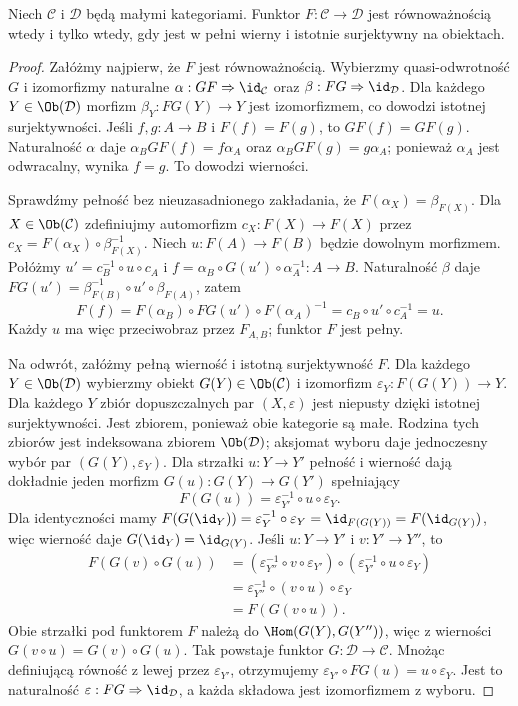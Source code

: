 \begin{twierdzenie}\label{tw:equivalence}
Niech $\mathcal C$ i $\mathcal D$ będą małymi kategoriami. Funktor $F:\mathcal C\to\mathcal D$ jest równoważnością wtedy i tylko wtedy, gdy jest w pełni wierny i istotnie surjektywny na obiektach.
\end{twierdzenie}
\begin{proof}
Załóżmy najpierw, że $F$ jest równoważnością. Wybierzmy quasi-odwrotność $G$ i izomorfizmy naturalne $\alpha:GF\Rightarrow\id_{\mathcal C}$ oraz $\beta:FG\Rightarrow\id_{\mathcal D}$. Dla każdego $Y\in\Ob(\mathcal D)$ morfizm $\beta_Y:FG(Y)\to Y$ jest izomorfizmem, co dowodzi istotnej surjektywności. Jeśli $f,g:A\to B$ i $F(f)=F(g)$, to $GF(f)=GF(g)$. Naturalność $\alpha$ daje $\alpha_BGF(f)=f\alpha_A$ oraz $\alpha_BGF(g)=g\alpha_A$; ponieważ $\alpha_A$ jest odwracalny, wynika $f=g$. To dowodzi wierności.

Sprawdźmy pełność bez nieuzasadnionego zakładania, że $F(\alpha_X)=\beta_{F(X)}$. Dla $X\in\Ob(\mathcal C)$ zdefiniujmy automorfizm $c_X:F(X)\to F(X)$ przez $c_X=F(\alpha_X)\circ\beta_{F(X)}^{-1}$. Niech $u:F(A)\to F(B)$ będzie dowolnym morfizmem. Połóżmy $u'=c_B^{-1}\circ u\circ c_A$ i $f=\alpha_B\circ G(u')\circ\alpha_A^{-1}:A\to B$. Naturalność $\beta$ daje
$FG(u')=\beta_{F(B)}^{-1}\circ u'\circ\beta_{F(A)}$, zatem
\[
F(f)=F(\alpha_B)\circ FG(u')\circ F(\alpha_A)^{-1}
=c_B\circ u'\circ c_A^{-1}=u.
\]
Każdy $u$ ma więc przeciwobraz przez $F_{A,B}$; funktor $F$ jest pełny.

Na odwrót, załóżmy pełną wierność i istotną surjektywność $F$. Dla każdego $Y\in\Ob(\mathcal D)$ wybierzmy obiekt $G(Y)\in\Ob(\mathcal C)$ i izomorfizm $\varepsilon_Y:F(G(Y))\to Y$. Dla każdego $Y$ zbiór dopuszczalnych par $(X,\varepsilon)$ jest niepusty dzięki istotnej surjektywności. Jest zbiorem, ponieważ obie kategorie są małe. Rodzina tych zbiorów jest indeksowana zbiorem $\Ob(\mathcal D)$; aksjomat wyboru daje jednoczesny wybór par $(G(Y),\varepsilon_Y)$. Dla strzałki $u:Y\to Y'$ pełność i wierność dają dokładnie jeden morfizm $G(u):G(Y)\to G(Y')$ spełniający
\[
F(G(u))=\varepsilon_{Y'}^{-1}\circ u\circ\varepsilon_Y.
\]
Dla identyczności mamy $F(G(\id_Y))=\varepsilon_Y^{-1}\circ\varepsilon_Y=\id_{F(G(Y))}=F(\id_{G(Y)})$, więc wierność daje $G(\id_Y)=\id_{G(Y)}$. Jeśli $u:Y\to Y'$ i $v:Y'\to Y''$, to
\[
\begin{aligned}
F(G(v)\circ G(u))
&=(\varepsilon_{Y''}^{-1}\circ v\circ\varepsilon_{Y'})
  \circ(\varepsilon_{Y'}^{-1}\circ u\circ\varepsilon_Y)\\
&=\varepsilon_{Y''}^{-1}\circ(v\circ u)\circ\varepsilon_Y\\
&=F(G(v\circ u)).
\end{aligned}
\]
Obie strzałki pod funktorem $F$ należą do $\Hom(G(Y),G(Y''))$, więc z wierności $G(v\circ u)=G(v)\circ G(u)$. Tak powstaje funktor $G:\mathcal D\to\mathcal C$. Mnożąc definiującą równość z lewej przez $\varepsilon_{Y'}$, otrzymujemy $\varepsilon_{Y'}\circ FG(u)=u\circ\varepsilon_Y$. Jest to naturalność $\varepsilon:FG\Rightarrow\id_{\mathcal D}$, a każda składowa jest izomorfizmem z wyboru.


\end{proof}
